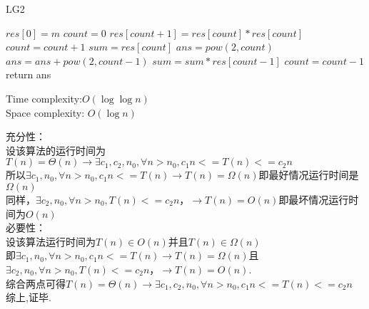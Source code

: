 \documentclass[a4paper, justified]{tufte-handout}
\begin{document}

\begin{problem}
\end{problem}

\begin{solution}
  \begin{algorithm}
    \caption{LG2}
    \label{alg:sum}
    \begin{algorithmic}[1]
      \State $res[0] = m$
      \State $count = 0$
      \State $res[count + 1] = res[count] * res[count]$
      \State $count = count + 1$
      \EndWhile
      \State $sum = res[count]$
      \State $ans = pow(2, count)$
      \State $ans = ans + pow(2, count - 1)$
      \State $sum = sum * res[count - 1]$
      \EndIf
      \State $count = count - 1$
      \EndWhile
      \State return ans
      \EndProcedure
    \end{algorithmic}
  \end{algorithm}
  Time complexity:$O (\log \log n)$\\
  Space complexity: $O(\log n)$
\end{solution}

\begin{problem}[TC Exercise 3.1-6]
\end{problem}

\begin{solution}
  充分性：\\
  设该算法的运行时间为$T(n) = \Theta(n) \rightarrow \exists c_1, c_2, n_0, \forall n > n_0, c_1 n <= T(n) <= c_2 n$ \\
  所以$\exists c_1, n_0, \forall n > n_0, c_1 n <= T(n) \rightarrow T(n) = \Omega (n)$即最好情况运行时间是$\Omega (n)$\\
  同样，$\exists c_2, n_0, \forall n > n_0,T(n) <= c_2 n，\rightarrow T(n) = O(n)$即最坏情况运行时间为$O(n)$\\
  必要性：\\
  设该算法运行时间为$T(n) \in O(n)$并且$T(n) \in \Omega(n)$\\
  即$\exists c_1, n_0, \forall n > n_0, c_1 n <= T(n) \rightarrow T(n) = \Omega (n)$且$\exists c_2, n_0, \forall n > n_0,T(n) <= c_2 n，\rightarrow T(n) = O(n)$.\\
  综合两点可得$T(n) = \Theta(n) \rightarrow \exists c_1, c_2, n_0, \forall n > n_0, c_1 n <= T(n) <= c_2 n$\\
  综上,证毕.
\end{solution}
\end{document}
